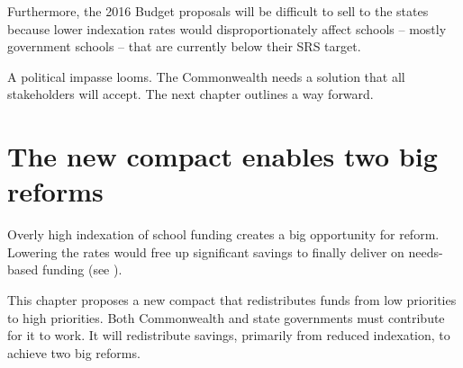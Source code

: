 \documentclass{grattan}
\begin{document}
Furthermore, the 2016 Budget proposals will be difficult to sell to the states because lower indexation rates would disproportionately affect schools -- mostly government schools -- that are currently below their SRS target.

A political impasse looms.
The Commonwealth needs a solution that all stakeholders will accept.
The next chapter outlines a way forward.

\chapter{The new compact enables two big reforms}\label{chap:the-new-compact-enables-two-big-reforms}

Overly high indexation of school funding creates a big opportunity for reform.
Lowering the rates would free up significant savings to finally deliver on  needs-based funding (see ).

This chapter proposes a new compact that redistributes funds from low priorities to high priorities.
Both Commonwealth and state governments must contribute for it to work.
It will redistribute savings, primarily from reduced indexation, to achieve two big reforms.
\end{document}
